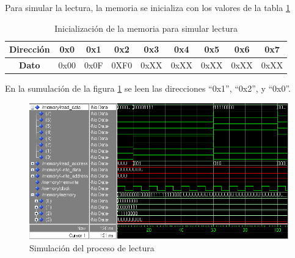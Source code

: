 Para simular la lectura, la memoria se inicializa con los valores de la tabla \ref{memlect}
\begin{table}[!ht] 
\centering
 \begin{tabular}{|c|c|c|c|c|c|c|c|c|}
\hline
\textbf{Dirección} & 0x0 & 0x1 & 0x2 & 0x3 & 0x4 & 0x5 & 0x6 & 0x7 \\ \hline
\textbf{Dato} & 0x00 & 0x0F & 0XF0 & 0xXX & 0xXX & 0xXX & 0xXX & 0xXX \\ \hline
\end{tabular}
  \caption{Inicialización de la memoria para simular lectura}
  \label{memlect}
\end{table}  

En la sumulación de la figura \ref{mem5} se leen las direcciones ``0x1'', ``0x2'', y ``0x0''.

\begin{figure}[]
  \centering
    \includegraphics[width=1\textwidth]{graficos/read.png}
  \caption{Simulación del proceso de lectura}
  \label{mem5}
\end{figure}
